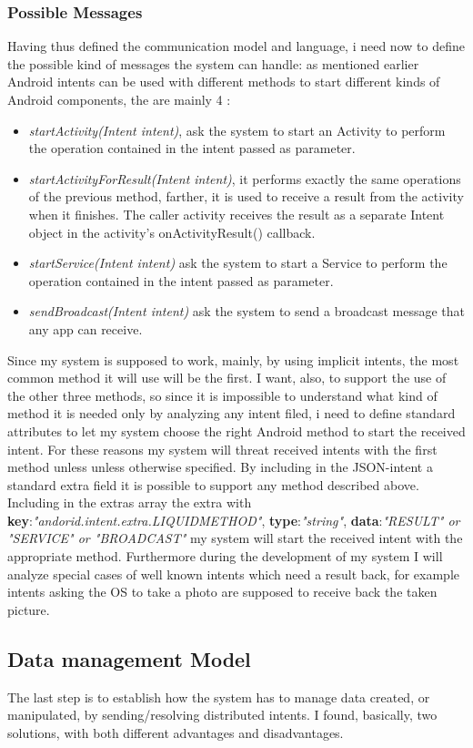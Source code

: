 \subsubsection{Possible Messages} \label{pm}
Having thus defined the communication model and language, i need now to define the possible kind of messages the system can handle: as mentioned earlier Android intents can be used with different methods to start different kinds of Android components, the are mainly 4 : 
\begin{itemize}
	\item \textit{startActivity(Intent intent)}, ask the system to start an Activity to perform the operation contained in the intent passed as parameter.
	\item \textit{startActivityForResult(Intent intent)}, it performs exactly the same operations of the previous method, farther, it is used to receive a result from the activity when it finishes. The caller activity receives the result as a separate Intent object in the activity's onActivityResult() callback.
	\item \textit{startService(Intent intent)} ask the system to start a Service to perform the operation contained in the intent passed as parameter.
	\item \textit{sendBroadcast(Intent intent)} ask the system to send a broadcast message that any app can receive.
\end{itemize}
Since my system is supposed to work, mainly, by using implicit intents, the most common method it will use will be the first. I want, also, to support the use of the other three methods, so since it is impossible to understand what kind of method it is needed only by analyzing any intent filed, i need to define standard attributes to let my system choose the right Android method to start the received intent. For these reasons my system will threat received intents with the first method unless unless otherwise specified. By including in the JSON-intent a standard extra field it is possible to support any method described above. Including in the extras array the extra with \textbf{key}:\textit{"andorid.intent.extra.LIQUIDMETHOD"}, \textbf{type}:\textit{"string"}, \textbf{data}:\textit{"RESULT" or "SERVICE" or "BROADCAST"} my system will start the received intent with the appropriate method. Furthermore during the development of my system I will analyze special cases of well known intents which need a result back, for example intents asking the OS to take a photo are supposed to receive back the taken picture.
 \subsection{Data management Model}
 The last step is to establish how the system has to manage data created, or manipulated, by sending/resolving distributed intents. I found, basically, two solutions, with both different advantages and disadvantages.
